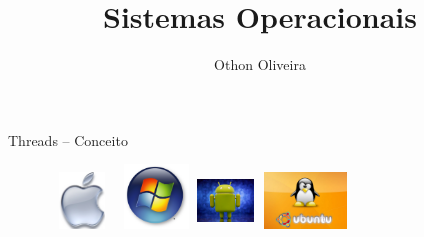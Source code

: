 \documentclass[11pt]{beamer}
\author{Othon Oliveira}
\title{Sistemas Operacionais}
\institute{Fatec -- Faculdade de Informática --- PE}
\begin{document}
\newcommand{\capa}{
    \begin{tikzpicture}[remember picture,overlay]
        \node at (current page.south west)
            {\begin{tikzpicture}[remember picture, overlay]
                \fill[shading=radial,top color=orange,bottom color=orange,middle color=yellow] (0,0) rectangle (\paperwidth,\paperheight);
            \end{tikzpicture}
          };
    \end{tikzpicture}
}


\begin{frame}
\titlepage
\end{frame}




\begin{frame}{Threads -- Conceito}
\begin{figure}[h]
\includegraphics[width=18mm, height=15mm]{Figuras/appleOficial.jpg}
\qquad \quad \quad \quad \quad
\includegraphics[width=19mm, height=17mm]{Figuras/windows.png}
\qquad \quad \quad \quad \quad \quad \quad 	\vspace{1.0in}
\includegraphics[width=15mm, height=15mm]{Figuras/android.jpg}
\qquad \quad \quad \quad \quad \quad \quad \quad 
\includegraphics[width=25mm, height=15mm]{Figuras/ubuntu_904.jpg}

\end{figure}
\end{frame}
\end{document}
